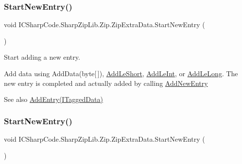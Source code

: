 \subsubsection{\texorpdfstring{Start\+New\+Entry()}{StartNewEntry()}\hspace{0.1cm}{\footnotesize\ttfamily [1/2]}}
{\footnotesize\ttfamily void I\+C\+Sharp\+Code.\+Sharp\+Zip\+Lib.\+Zip.\+Zip\+Extra\+Data.\+Start\+New\+Entry (\begin{DoxyParamCaption}{ }\end{DoxyParamCaption})\hspace{0.3cm}{\ttfamily [inline]}}



Start adding a new entry. 

Add data using Add\+Data(byte\mbox{[}$\,$\mbox{]}), \hyperlink{class_i_c_sharp_code_1_1_sharp_zip_lib_1_1_zip_1_1_zip_extra_data_acc356859af6fe44b71ca605473385dec}{Add\+Le\+Short}, \hyperlink{class_i_c_sharp_code_1_1_sharp_zip_lib_1_1_zip_1_1_zip_extra_data_ac688733a0684d0e2a32da357d444212a}{Add\+Le\+Int}, or \hyperlink{class_i_c_sharp_code_1_1_sharp_zip_lib_1_1_zip_1_1_zip_extra_data_aafc11e296c9769e11ddfbc07dee754e7}{Add\+Le\+Long}. The new entry is completed and actually added by calling \hyperlink{class_i_c_sharp_code_1_1_sharp_zip_lib_1_1_zip_1_1_zip_extra_data_aba673aeb5ed08038a5c76377c0607ca9}{Add\+New\+Entry}

\begin{DoxySeeAlso}{See also}
\hyperlink{class_i_c_sharp_code_1_1_sharp_zip_lib_1_1_zip_1_1_zip_extra_data_a86f3cb0b8dcd274f0bc84d75e06ba703}{Add\+Entry(\+I\+Tagged\+Data)}


\end{DoxySeeAlso}
\mbox{\label{class_i_c_sharp_code_1_1_sharp_zip_lib_1_1_zip_1_1_zip_extra_data_a3fd5ac216b1b6a0fe5ae92ea8156f20a}} 
\subsubsection{\texorpdfstring{Start\+New\+Entry()}{StartNewEntry()}\hspace{0.1cm}{\footnotesize\ttfamily [2/2]}}
{\footnotesize\ttfamily void I\+C\+Sharp\+Code.\+Sharp\+Zip\+Lib.\+Zip.\+Zip\+Extra\+Data.\+Start\+New\+Entry (\begin{DoxyParamCaption}{ }\end{DoxyParamCaption})\hspace{0.3cm}{\ttfamily [inline]}}



